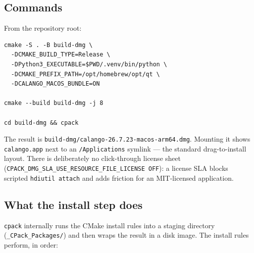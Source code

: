 \documentclass[11pt,a4paper]{article}
\newcommand{\file}[1]{\texttt{#1}}
\newcommand{\opt}[1]{\texttt{#1}}
\begin{document}
\subsection{Commands}

From the repository root:

\begin{lstlisting}
cmake -S . -B build-dmg \
  -DCMAKE_BUILD_TYPE=Release \
  -DPython3_EXECUTABLE=$PWD/.venv/bin/python \
  -DCMAKE_PREFIX_PATH=/opt/homebrew/opt/qt \
  -DCALANGO_MACOS_BUNDLE=ON

cmake --build build-dmg -j 8

cd build-dmg && cpack
\end{lstlisting}

The result is \file{build-dmg/calango-26.7.23-macos-arm64.dmg}. Mounting
it shows \file{calango.app} next to an \file{/Applications} symlink ---
the standard drag-to-install layout. There is deliberately no
click-through license sheet
(\opt{CPACK\_DMG\_SLA\_USE\_RESOURCE\_FILE\_LICENSE OFF}): a license SLA
blocks scripted \file{hdiutil attach} and adds friction for an
MIT-licensed application.

\subsection{What the install step does}

\opt{cpack} internally runs the CMake install rules into a staging
directory (\file{\_CPack\_Packages/}) and then wraps the result in a
disk image. The install rules perform, in order:
\end{document}
